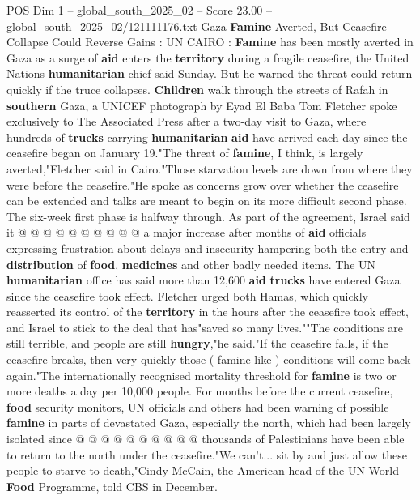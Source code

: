 \begin{textsample}{POS Dim 1 – global\_south\_2025\_02 – Score 23.00 – global\_south\_2025\_02/121111176.txt}  \label{ex:f1_pos_413}
Gaza \textbf{Famine} Averted, But Ceasefire Collapse Could Reverse Gains : UN CAIRO : \textbf{Famine} has been mostly averted in Gaza as a surge of \textbf{aid} enters the \textbf{territory} during a fragile ceasefire, the United Nations \textbf{humanitarian} chief said Sunday.
But he warned the threat could return quickly if the truce collapses. \textbf{Children} walk through the streets of Rafah in \textbf{southern} Gaza, a UNICEF photograph by Eyad El Baba Tom Fletcher spoke exclusively to The Associated Press after a two-day visit to Gaza, where hundreds of \textbf{trucks} carrying \textbf{humanitarian} \textbf{aid} have arrived each day since the ceasefire began on January 19."The threat of \textbf{famine}, I think, is largely averted,"Fletcher said in Cairo."Those starvation levels are down from where they were before the ceasefire."He spoke as concerns grow over whether the ceasefire can be extended and talks are meant to begin on its more difficult second phase.
The six-week first phase is halfway through.
As part of the agreement, Israel said it @ @ @ @ @ @ @ @ @ @ a major increase after months of \textbf{aid} officials expressing frustration about delays and insecurity hampering both the entry and \textbf{distribution} of \textbf{food}, \textbf{medicines} and other badly needed items.
The UN \textbf{humanitarian} office has said more than 12,600 \textbf{aid} \textbf{trucks} have entered Gaza since the ceasefire took effect.
Fletcher urged both Hamas, which quickly reasserted its control of the \textbf{territory} in the hours after the ceasefire took effect, and Israel to stick to the deal that has"saved so many lives.""The conditions are still terrible, and people are still \textbf{hungry},"he said."If the ceasefire falls, if the ceasefire breaks, then very quickly those ( famine-like ) conditions will come back again."The internationally recognised mortality threshold for \textbf{famine} is two or more deaths a day per 10,000 people.
For months before the current ceasefire, \textbf{food} security monitors, UN officials and others had been warning of possible \textbf{famine} in parts of devastated Gaza, especially the north, which had been largely isolated since @ @ @ @ @ @ @ @ @ @ thousands of Palestinians have been able to return to the north under the ceasefire."We can't... sit by and just allow these people to starve to death,"Cindy McCain, the American head of the UN World \textbf{Food} Programme, told CBS in December.

\end{textsample}
